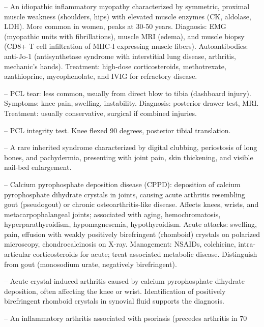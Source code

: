 -- An idiopathic inflammatory myopathy characterized by symmetric, proximal muscle weakness (shoulders, hips) with elevated muscle enzymes (CK, aldolase, LDH). More common in women, peaks at 30-50 years. Diagnosis: EMG (myopathic units with fibrillations), muscle MRI (edema), and muscle biopsy (CD8+ T cell infiltration of MHC-I expressing muscle fibers). Autoantibodies: anti-Jo-1 (antisynthetase syndrome with interstitial lung disease, arthritis, mechanic's hands). Treatment: high-dose corticosteroids, methotrexate, azathioprine, mycophenolate, and IVIG for refractory disease.

-- PCL tear: less common, usually from direct blow to tibia (dashboard injury). Symptoms: knee pain, swelling, instability. Diagnosis: posterior drawer test, MRI. Treatment: usually conservative, surgical if combined injuries.

-- PCL integrity test. Knee flexed 90 degrees, posterior tibial translation.

-- A rare inherited syndrome characterized by digital clubbing, periostosis of long bones, and pachydermia, presenting with joint pain, skin thickening, and visible nail-bed enlargement.

-- Calcium pyrophosphate deposition disease (CPPD): deposition of calcium pyrophosphate dihydrate crystals in joints, causing acute arthritis resembling gout (pseudogout) or chronic osteoarthritis-like disease. Affects knees, wrists, and metacarpophalangeal joints; associated with aging, hemochromatosis, hyperparathyroidism, hypomagnesemia, hypothyroidism. Acute attacks: swelling, pain, effusion with weakly positively birefringent (rhomboid) crystals on polarized microscopy, chondrocalcinosis on X-ray. Management: NSAIDs, colchicine, intra-articular corticosteroids for acute; treat associated metabolic disease. Distinguish from gout (monosodium urate, negatively birefringent).

-- Acute crystal-induced arthritis caused by calcium pyrophosphate dihydrate deposition, often affecting the knee or wrist. Identification of positively birefringent rhomboid crystals in synovial fluid supports the diagnosis.

-- An inflammatory arthritis associated with psoriasis (precedes arthritis in 70%

